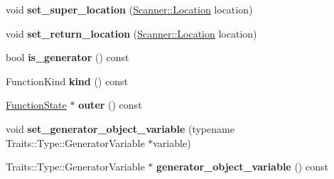 \begin{DoxyCompactItemize}
\item 
void {\bfseries set\+\_\+super\+\_\+location} (\hyperlink{structv8_1_1internal_1_1_scanner_1_1_location}{Scanner\+::\+Location} location)\hypertarget{classv8_1_1internal_1_1_parser_base_1_1_b_a_s_e___e_m_b_e_d_d_e_d_adb28e25e1303f63734d72118c5902684}{}\label{classv8_1_1internal_1_1_parser_base_1_1_b_a_s_e___e_m_b_e_d_d_e_d_adb28e25e1303f63734d72118c5902684}

\item 
void {\bfseries set\+\_\+return\+\_\+location} (\hyperlink{structv8_1_1internal_1_1_scanner_1_1_location}{Scanner\+::\+Location} location)\hypertarget{classv8_1_1internal_1_1_parser_base_1_1_b_a_s_e___e_m_b_e_d_d_e_d_ab2b3a34196fa37f7b25d7a6b29f87654}{}\label{classv8_1_1internal_1_1_parser_base_1_1_b_a_s_e___e_m_b_e_d_d_e_d_ab2b3a34196fa37f7b25d7a6b29f87654}

\item 
bool {\bfseries is\+\_\+generator} () const \hypertarget{classv8_1_1internal_1_1_parser_base_1_1_b_a_s_e___e_m_b_e_d_d_e_d_a47a9d82c53032671ba31fa7bd2981a20}{}\label{classv8_1_1internal_1_1_parser_base_1_1_b_a_s_e___e_m_b_e_d_d_e_d_a47a9d82c53032671ba31fa7bd2981a20}

\item 
Function\+Kind {\bfseries kind} () const \hypertarget{classv8_1_1internal_1_1_parser_base_1_1_b_a_s_e___e_m_b_e_d_d_e_d_a09737dbcc45b975624083542ceb8c3eb}{}\label{classv8_1_1internal_1_1_parser_base_1_1_b_a_s_e___e_m_b_e_d_d_e_d_a09737dbcc45b975624083542ceb8c3eb}

\item 
\hyperlink{classv8_1_1internal_1_1_function_state}{Function\+State} $\ast$ {\bfseries outer} () const \hypertarget{classv8_1_1internal_1_1_parser_base_1_1_b_a_s_e___e_m_b_e_d_d_e_d_a4d2a26bf2fe695e7ae959792c783a90f}{}\label{classv8_1_1internal_1_1_parser_base_1_1_b_a_s_e___e_m_b_e_d_d_e_d_a4d2a26bf2fe695e7ae959792c783a90f}

\item 
void {\bfseries set\+\_\+generator\+\_\+object\+\_\+variable} (typename Traits\+::\+Type\+::\+Generator\+Variable $\ast$variable)\hypertarget{classv8_1_1internal_1_1_parser_base_1_1_b_a_s_e___e_m_b_e_d_d_e_d_a093589069385eb98d8fa30899e994b1f}{}\label{classv8_1_1internal_1_1_parser_base_1_1_b_a_s_e___e_m_b_e_d_d_e_d_a093589069385eb98d8fa30899e994b1f}

\item 
Traits\+::\+Type\+::\+Generator\+Variable $\ast$ {\bfseries generator\+\_\+object\+\_\+variable} () const \hypertarget{classv8_1_1internal_1_1_parser_base_1_1_b_a_s_e___e_m_b_e_d_d_e_d_a1ca19792b3ccd1d09341844c5f9fd4b8}{}\label{classv8_1_1internal_1_1_parser_base_1_1_b_a_s_e___e_m_b_e_d_d_e_d_a1ca19792b3ccd1d09341844c5f9fd4b8}


\end{DoxyCompactItemize}

